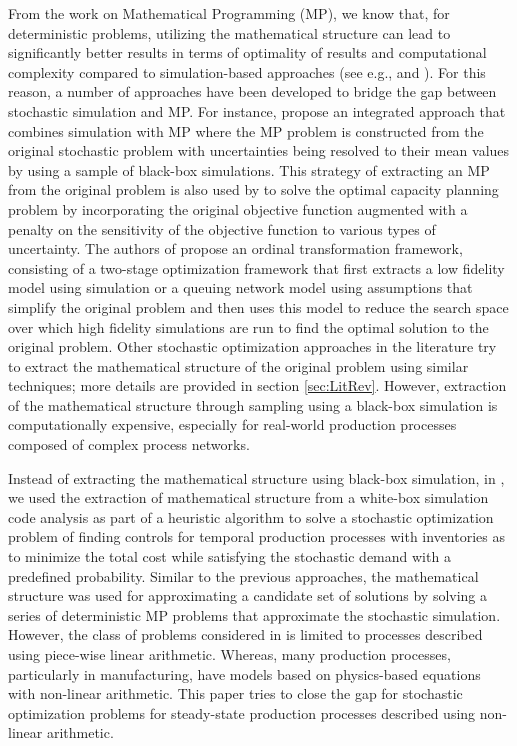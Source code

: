 \documentclass[a4paper, 12pt]{article} %
\begin{document}

From the work on Mathematical Programming (MP), we know that, for deterministic problems, utilizing the mathematical structure can lead to significantly better results in terms of optimality of results and computational complexity compared to simulation-based approaches (see e.g., \cite{Amaran2016} and \cite{Klemmt2009}). 
For this reason, a number of approaches have been developed to bridge the gap between stochastic simulation and MP.
For instance, \cite{thompson_integrated_1990} propose an integrated approach that combines simulation with MP where the MP problem is constructed from the original stochastic problem with uncertainties being resolved to their mean values by using a sample of black-box simulations. This strategy of extracting an MP from the original problem is also used by \cite{paraskevopoulos_robust_1991} to solve the optimal capacity planning problem by incorporating the original objective function augmented with a penalty on the sensitivity of the objective function to various types of uncertainty.
The authors of \cite{Xu2014MultiFid} propose an ordinal transformation framework, 
consisting of a two-stage optimization framework that first extracts a low fidelity model using simulation or a queuing network model using assumptions that simplify the original problem and then uses this model to reduce the search space over which high fidelity simulations are run to find the optimal solution to the original problem.
Other stochastic optimization approaches in the literature try to extract the mathematical structure of the original problem using similar techniques; more details are provided in section \ref{sec:LitRev}.
However, extraction of the mathematical structure through sampling using a black-box simulation is computationally expensive, especially for real-world production processes composed of complex process networks.

Instead of extracting the mathematical structure using black-box simulation, in \cite{Krishnamoorthy2015}, we used the extraction of mathematical structure from a white-box simulation code analysis as part of a heuristic algorithm to solve a stochastic optimization problem of finding controls for temporal production processes with inventories as to minimize the total cost while satisfying the stochastic demand with a predefined probability.
Similar to the  previous approaches, the mathematical structure was used for approximating a candidate set of solutions by solving a series of deterministic MP problems that approximate the stochastic simulation. 
However, the class of problems considered in \cite{Krishnamoorthy2015} is limited to processes described using piece-wise linear arithmetic. 
Whereas, many production processes, particularly in manufacturing, have models based on physics-based equations with non-linear arithmetic. 
This paper tries to close the gap for stochastic optimization problems for steady-state production processes described using non-linear arithmetic.
\end{document}
